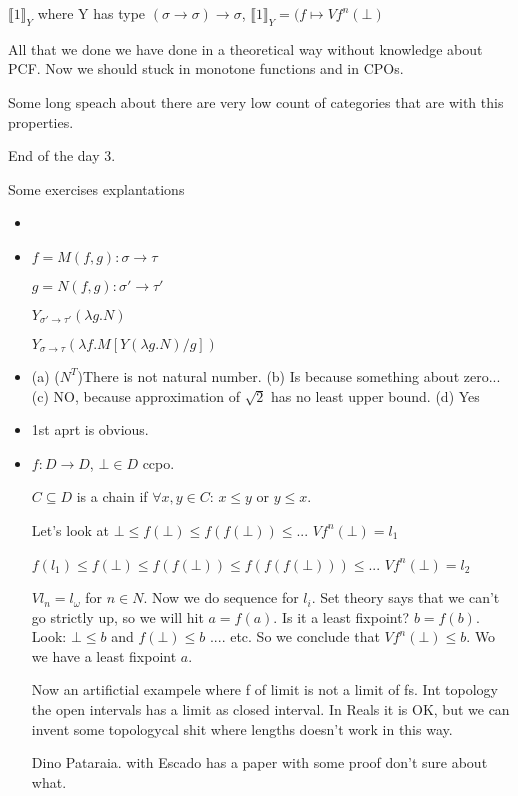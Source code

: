 \documentclass[a4paper,10pt]{book}
\newcommand{\sem}[2]{ \llbracket#1\rrbracket_{#2} }
\newcommand{\rarr}{ \rightarrow }
\begin{document}
$\sem1{Y}$ where Y has type $(\sigma\rarr\sigma)\rarr\sigma$,
$\sem1{Y} = (f \mapsto V f^n(\bot)$

All that we done we have done in a theoretical way without knowledge about PCF. Now we
should stuck in monotone functions and in CPOs.

Some long speach about there are very low count of categories that are with this properties.

End of the day 3.


Some exercises explantations

\begin{itemize}
 \item 
 \item $f = M (f, g) : \sigma \rarr \tau$
 
 $g = N(f,g) : \sigma' \rarr \tau'$
 
 $Y_{\sigma' \rarr \tau'} (\lambda g . N)$
 
 $Y_{\sigma \rarr \tau} (\lambda f . M[Y(\lambda g . N) / g])$
 \item (a) ($N^T$)There is not natural number.
   (b) Is because something about zero...
   (c) NO, because approximation of $\sqrt{2}$ has no least upper bound.
   (d) Yes
 \item 1st aprt is obvious.
 \item $f:D \rarr D$, $\bot \in D$ ccpo.
 
 $C \subseteq  D$ is a chain  if $\forall x,y \in C$: $x \leq y$ or $y\leq x$.
 
 Let's look at $\bot \leq f(\bot) \leq f(f(\bot)) \leq ...$ $Vf^n(\bot) = l_1$

 $f(l_1) \leq f(\bot) \leq f(f(\bot)) \leq f(f(f(\bot))) \leq ...$ $Vf^n(\bot) = l_2$
 
 $V l_n = l_\omega$ for $n\in N$. Now we do  sequence for $l_i$. 
 Set theory says that we can't go strictly up,  so we will hit $a=f(a)$. Is it a least fixpoint?
 $b=f(b)$. Look: $\bot \leq b$ and $f(\bot) \leq b$ .... etc. So we conclude that 
 $V f^n(\bot) \leq b$. Wo we have a least fixpoint $a$.
 
 Now an artifictial exampele where f of limit is not a limit of fs. Int topology the 
 open intervals has a limit as closed interval. In Reals it is OK, but we can invent some topologycal
 shit where lengths doesn't work in this way.
 
 Dino Pataraia. with Escado has a paper with some proof don't sure about what.
 
 \end{itemize}
\end{document}

